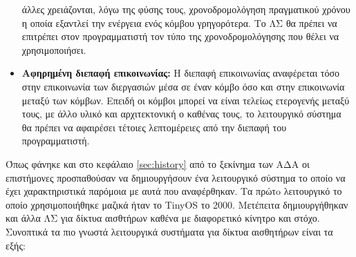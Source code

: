 \begin{itemize}
άλλες χρειάζονται, λόγω της φύσης τους, χρονοδρομολόγηση πραγματικού χρόνου η οποία εξαντλεί την ενέργεια ενός κόμβου γρηγορότερα.
Το ΛΣ θα πρέπει να επιτρέπει στον προγραμματιστή τον τύπο της χρονοδρομολόγησης που θέλει να χρησιμοποιήσει.
\item \textbf{Αφηρημένη διεπαφή επικοινωνίας:} Η διεπαφή επικοινωνίας αναφέρεται τόσο στην επικοινωνία των διεργασιών μέσα σε έναν κόμβο όσο και στην επικοινωνία
μεταξύ των κόμβων.
Επειδή οι κόμβοι μπορεί να είναι τελείως ετερογενής μεταξύ τους, με άλλο υλικό και αρχιτεκτονική ο καθένας τους, το λειτουργικό σύστημα θα πρέπει να αφαιρέσει
τέτοιες λεπτομέρειες από την διεπαφή του προγραμματιστή.
\end{itemize}

Όπως φάνηκε και στο κεφάλαιο \ref{sec:history} από το ξεκίνημα των ΑΔΑ οι επιστήμονες προσπαθούσαν να δημιουργήσουν ένα λειτουργικό σύστημα το οποίο να έχει
χαρακτηριστικά παρόμοια με αυτά που αναφέρθηκαν.
Τα πρώτo λειτουργικό το οποίο χρησιμοποιήθηκε μαζικά ήταν το TinyOS το 2000.
Μετέπειτα δημιουργήθηκαν και άλλα ΛΣ για δίκτυα αισθτήρων καθένα με διαφορετικό κίνητρο και στόχο.
Συνοπτικά τα πιο γνωστά λειτουργικά συστήματα για δίκτυα αισθητήρων είναι τα εξής:

